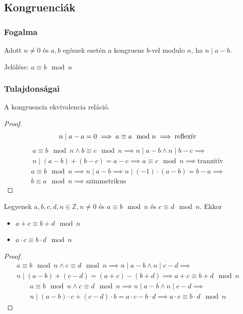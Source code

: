 \setcounter{definition}{0}
\setcounter{theorem}{0}
\subsection{Kongruenciák}
\subsubsection{Fogalma}
\begin{definition}
	Adott $n \neq 0$ és $a, b$ egészek esetén
	$a$ kongruens $b$-vel modulo $n$, ha $n \mid a - b$.
\end{definition}
\begin{remark*}
	Jelölése: $a \equiv b \mod n$
\end{remark*}
\subsubsection{Tulajdonságai}
\begin{theorem}
	A kongruencia ekvivalencia reláció.
\end{theorem}
\begin{proof}
	\begin{equation*}
		n \mid a - a = 0 \implies a \equiv a \mod n \implies \text{reflexív} \\
	\end{equation*}
	\begin{multline*}
		a \equiv b \mod n \land b \equiv c \mod n \implies
		n \mid a - b \land n \mid b - c \implies \\
		n \mid (a - b) + (b - c) = a - c \implies
		a \equiv c \mod n \implies \text{tranzitív}
	\end{multline*}
	\begin{multline*}
		a \equiv b \mod n \implies n \mid a - b \implies
		n \mid (-1) \cdot (a - b) = b - a \implies \\
		b \equiv a \mod n \implies \text{szimmetrikus}
	\end{multline*}
\end{proof}
\begin{theorem}
	Legyenek $a, b, c, d, n \in \mathbb{Z}, n \neq 0$ és
	$a \equiv b \mod n$ és $c \equiv d \mod n$. Ekkor
	\begin{itemize}
		\item $a + c \equiv b + d \mod n$
		\item $a \cdot c \equiv b \cdot d \mod n$
	\end{itemize}
\end{theorem}
\begin{proof}
	\begin{multline*}
		a \equiv b \mod n \land c \equiv d \mod n \implies
		n \mid a - b \land n \mid c - d \implies \\
		n \mid (a - b) + (c - d) = (a + c) - (b + d) \implies
		a + c \equiv b + d \mod n
	\end{multline*}
	\begin{multline*}
		a \equiv b \mod n \land c \equiv d \mod n \implies
		n \mid a - b \land n \mid c - d \implies \\
		n \mid (a - b) \cdot c + (c - d) \cdot b =
		a \cdot c - b \cdot d \implies
		a \cdot c \equiv b \cdot d \mod n
	\end{multline*}
\end{proof}

